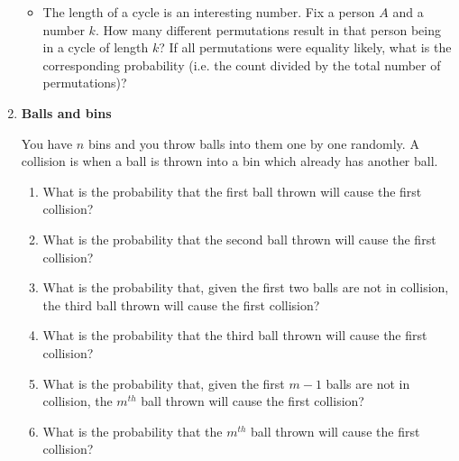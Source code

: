 \documentclass[11pt]{article}
\newif\ifsolutions
\begin{document}
\begin{enumerate}
\begin{itemize}
      \ifsolutions{\color{blue}
	\vspace{-20mm}
        We must see a repetition at some point. But every person other than $A$ has been seen as a role model of someone else (i.e. the previous person).
        Since role models are unique, no other person can be the first repetition (otherwise that person will be the role model of two different people).
      } \fi
    \item The length of a cycle is an interesting number. Fix a person $A$ and a number $k$. How many different permutations result in that person being in 
      a cycle of length $k$? If all permutations were equality likely, what is the corresponding probability (i.e. the count divided by the total number
      of permutations)?

	\vspace{20mm}
      \ifsolutions{\color{blue}
	\vspace{-20mm}
        First we must select the $k$ members of the cycle. This can be done in ${n-1 choose k-1}$ ways. Then we must permute them in order to form a cycle (
        we keep $A$ as the head of the cycle to avoid repetition). This can be done in $(k-1)!$ ways. Then we construct a permutation on the remaining $n-k$
        people in $(n-k)!$ ways. So the total number is $(n-k)!(k-1)!{n-1\choose k-1}=(n-1)!$. This translates to a probability of $1/n$.
      } \fi
  \end{itemize}




\item {\bf Balls and bins}
  
  You have $n$ bins and you throw balls into them one by one randomly.
  A collision is when a ball is thrown into a bin which already has another ball.
  \begin{enumerate}
  \item What is the probability that the first ball thrown will cause the first collision?
	\vspace{5mm}
  \item What is the probability that the second ball thrown will cause the first collision?
	\vspace{5mm}
  \item What is the probability that, given the first two balls are not in collision, 
    the third ball thrown will cause the first collision?
	\vspace{10mm}
  \item What is the probability that the third ball thrown will cause the first collision? 
	\vspace{10mm}
  \item What is the probability that, given the first $m-1$ balls are not in collision, 
    the $m^{th}$ ball thrown will cause the first collision?
	\vspace{10mm}
  \item What is the probability that the $m^{th}$ ball thrown will cause the first collision? 
  \end{enumerate}


\end{enumerate}
\end{document}
